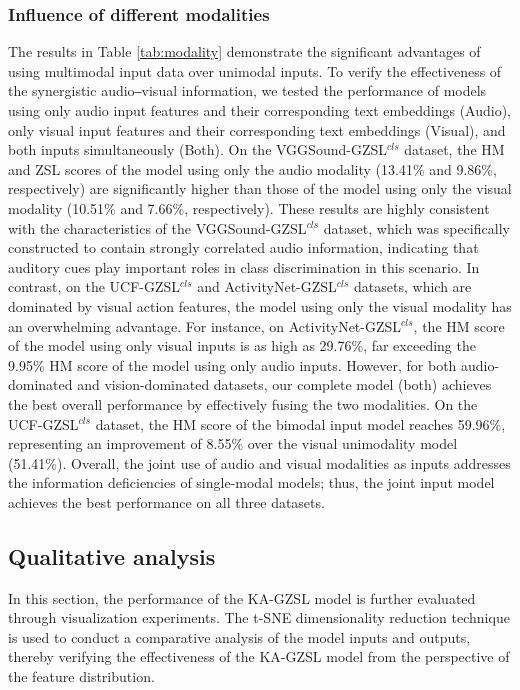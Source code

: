 \documentclass[lettersize,journal]{IEEEtran}
\begin{document}
\subsubsection{Influence of different modalities}
The results in Table \ref{tab:modality} demonstrate the significant advantages of using multimodal input data over unimodal inputs. To verify the effectiveness of the synergistic audio‒visual information, we tested the performance of models using only audio input features and their corresponding text embeddings (Audio), only visual input features and their corresponding text embeddings (Visual), and both inputs simultaneously (Both). On the VGGSound-GZSL$^{\textit{cls}}$ dataset, the HM and ZSL scores of the model using only the audio modality (13.41\% and 9.86\%, respectively) are significantly higher than those of the model using only the visual modality (10.51\% and 7.66\%, respectively). These results are highly consistent with the characteristics of the VGGSound-GZSL$^{\textit{cls}}$ dataset, which was specifically constructed to contain strongly correlated audio information, indicating that auditory cues play important roles in class discrimination in this scenario. In contrast, on the UCF-GZSL$^{\textit{cls}}$ and ActivityNet-GZSL$^{\textit{cls}}$ datasets, which are dominated by visual action features, the model using only the visual modality has an overwhelming advantage. For instance, on ActivityNet-GZSL$^{\textit{cls}}$, the HM score of the model using only visual inputs is as high as 29.76\%, far exceeding the 9.95\% HM score of the model using only audio inputs. However, for both audio-dominated and vision-dominated datasets, our complete model (both) achieves the best overall performance by effectively fusing the two modalities. On the UCF-GZSL$^{\textit{cls}}$ dataset, the HM score of the bimodal input model reaches 59.96\%, representing an improvement of 8.55\% over the visual unimodality model (51.41\%). Overall, the joint use of audio and visual modalities as inputs addresses the information deficiencies of single-modal models; thus, the joint input model achieves the best performance on all three datasets.


\subsection{Qualitative analysis}
In this section, the performance of the KA-GZSL model is further evaluated through visualization experiments. The t-SNE\cite{46} dimensionality reduction technique is used to conduct a comparative analysis of the model inputs and outputs, thereby verifying the effectiveness of the KA-GZSL model from the perspective of the feature distribution.
\end{document}
